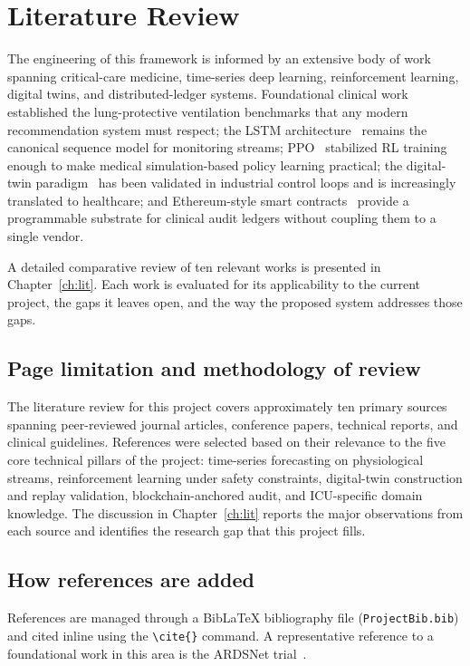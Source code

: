 \documentclass[12pt,a4paper,oneside]{report}
\begin{document}
\section{Literature Review}
The engineering of this framework is informed by an extensive body of work spanning critical-care medicine, time-series deep learning, reinforcement learning, digital twins, and distributed-ledger systems. Foundational clinical work~\cite{ards2000} established the lung-protective ventilation benchmarks that any modern recommendation system must respect; the LSTM architecture~\cite{hochreiter1997} remains the canonical sequence model for monitoring streams; PPO~\cite{schulman2017} stabilized RL training enough to make medical simulation-based policy learning practical; the digital-twin paradigm~\cite{tao2018,fahim2022} has been validated in industrial control loops and is increasingly translated to healthcare; and Ethereum-style smart contracts~\cite{wood2014} provide a programmable substrate for clinical audit ledgers without coupling them to a single vendor.

A detailed comparative review of ten relevant works is presented in Chapter~\ref{ch:lit}. Each work is evaluated for its applicability to the current project, the gaps it leaves open, and the way the proposed system addresses those gaps.

\subsection{Page limitation and methodology of review}
The literature review for this project covers approximately ten primary sources spanning peer-reviewed journal articles, conference papers, technical reports, and clinical guidelines. References were selected based on their relevance to the five core technical pillars of the project: time-series forecasting on physiological streams, reinforcement learning under safety constraints, digital-twin construction and replay validation, blockchain-anchored audit, and ICU-specific domain knowledge. The discussion in Chapter~\ref{ch:lit} reports the major observations from each source and identifies the research gap that this project fills.

\subsection{How references are added}
References are managed through a BibLaTeX bibliography file (\texttt{ProjectBib.bib}) and cited inline using the \texttt{\textbackslash cite\{\}} command. A representative reference to a foundational work in this area is the ARDSNet trial~\cite{ards2000}.
\end{document}
